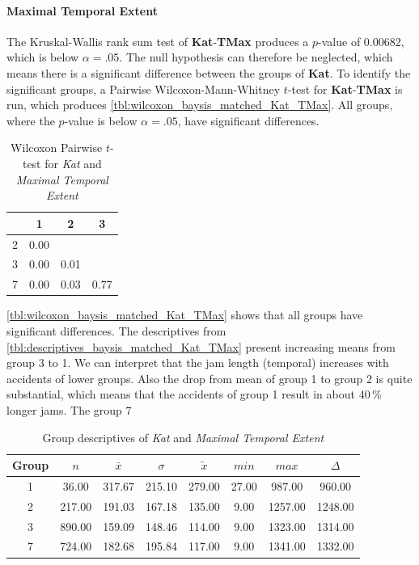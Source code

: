 \paragraph{Maximal Temporal Extent}
The Kruskal-Wallis rank sum test of \textbf{Kat}-\textbf{TMax} produces a $p$-value of 0.00682, which is below $\alpha=.05$. The null hypothesis can therefore be neglected, which means there is a significant difference between the groups of \textbf{Kat}. To identify the significant groups, a Pairwise Wilcoxon-Mann-Whitney $t$-test for \textbf{Kat}-\textbf{TMax} is run, which produces \autoref{tbl:wilcoxon_baysis_matched_Kat_TMax}. All groups, where the $p$-value is below $\alpha=.05$, have significant differences. 
\begin{table}[ht]
	\small
	\centering
	\begin{tabular}{c|c|c|c}
	  	\toprule
	 	& 1 & 2 & 3 \\ 
	  	\midrule
		2 & 0.00 &  &  \\ 
	  	3 & 0.00 & 0.01 &  \\ 
	  	7 & 0.00 & 0.03 & 0.77 \\ 
	   	\bottomrule
	\end{tabular}
	\caption{Wilcoxon Pairwise $t$-test for \textit{Kat} and \textit{Maximal Temporal Extent}}
	\label{tbl:wilcoxon_baysis_matched_Kat_TMax}
\end{table}
\autoref{tbl:wilcoxon_baysis_matched_Kat_TMax} shows that all groups have significant differences. The descriptives from \autoref{tbl:descriptives_baysis_matched_Kat_TMax} present increasing means from group 3 to 1.	We can interpret that the jam length (temporal) increases with accidents of lower groups. Also the drop from mean of group 1 to group 2 is quite substantial, which means that the accidents of group 1 result in about 40\,\% longer jams. The group 7 
\begin{table}[ht]
	\small
	\centering
	\begin{tabular}{c|c|c|c|c|c|c|c}
		\toprule
		Group & $n$ & $\bar{x}$ & $\sigma$ & $\tilde{x}$ & $min$ & $max$ & $\Delta$ \\   
	  	\midrule
		1 & 36.00 & 317.67 & 215.10 & 279.00   & 27.00 & 987.00 & 960.00  \\ 
	  	2 & 217.00 & 191.03 & 167.18 & 135.00 & 9.00 & 1257.00 & 1248.00  \\ 
	  	3 & 890.00 & 159.09 & 148.46 & 114.00 & 9.00 & 1323.00 & 1314.00  \\ 
	  	7 & 724.00 & 182.68 & 195.84 & 117.00  & 9.00 & 1341.00 & 1332.00 \\ 
	   	\bottomrule
	\end{tabular}
	\caption{Group descriptives of \textit{Kat} and \textit{Maximal Temporal Extent}}
	\label{tbl:descriptives_baysis_matched_Kat_TMax}
	\vspace{-8mm}
\end{table}

